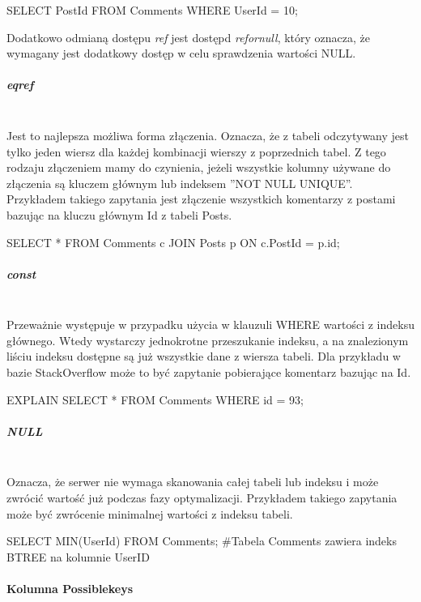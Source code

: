 \begin{spverbatim}
	SELECT PostId FROM Comments WHERE UserId = 10;
\end{spverbatim}
Dodatkowo odmianą dostępu \textit{ref} jest dostępd \textit{ref\textunderscore or\textunderscore null}, który oznacza, że wymagany jest dodatkowy dostęp w celu sprawdzenia wartości NULL.


\subparagraph{eq\textunderscore ref}\leavevmode\\

Jest to najlepsza możliwa forma złączenia. Oznacza, że z tabeli odczytywany jest tylko jeden wiersz dla każdej kombinacji wierszy z poprzednich tabel. Z tego rodzaju złączeniem mamy do czynienia, jeżeli wszystkie kolumny używane do złączenia są kluczem głównym lub indeksem ''NOT NULL UNIQUE''. Przykładem takiego zapytania jest złączenie wszystkich komentarzy z postami bazując na kluczu głównym Id z tabeli Posts. 

\begin{spverbatim}
	SELECT * FROM Comments c JOIN Posts p ON c.PostId = p.id;
\end{spverbatim}

\subparagraph{const}\leavevmode\\
Przeważnie występuje w przypadku użycia w klauzuli WHERE wartości z indeksu głównego. Wtedy wystarczy jednokrotne przeszukanie indeksu, a na znalezionym liściu indeksu dostępne są już wszystkie dane z wiersza tabeli. Dla przykładu w bazie StackOverflow może to być zapytanie pobierające komentarz bazując na Id.
\begin{spverbatim}
	EXPLAIN SELECT * FROM Comments WHERE id = 93;
\end{spverbatim}

\subparagraph{NULL}\leavevmode\\
Oznacza, że serwer nie wymaga skanowania całej tabeli lub indeksu i może zwrócić wartość już podczas fazy optymalizacji. Przykładem takiego zapytania może być zwrócenie minimalnej wartości z indeksu tabeli.

\begin{spverbatim}
	SELECT MIN(UserId) FROM Comments;
	#Tabela Comments zawiera indeks BTREE na kolumnie UserID
\end{spverbatim}

\paragraph{Kolumna Possible\textunderscore keys}\leavevmode\\

